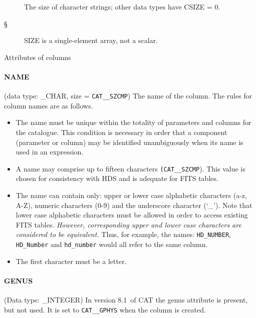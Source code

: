 \documentclass[11pt,twoside]{starlink}
\providecommand{\CATversion}{8.1~}
\begin{document}
\begin{table}[htbp]
\begin{description}

  \item[{\rm \dag}] The size of character strings; other data types
   have CSIZE = 0.

  \item[{\rm \S}] SIZE is a single-element array, not a scalar.

\end{description}

\caption{\label{CATTRIB}Attributes of columns}

\end{table}

\paragraph{NAME}
(data type: \_CHAR, size = \texttt{CAT\_\_SZCMP})
The name of the column. The rules for column names are as follows.

\begin{itemize}

  \item The name must be unique within the totality of parameters and
   columns for the catalogue. This condition is necessary in order that
   a component (parameter or column) may be identified unambiguously
   when its name is used in an expression.

  \item A name may comprise up to fifteen characters \texttt{(CAT\_\_SZCMP}). This value is chosen for consistency with HDS and
   is adequate for FITS tables.

  \item The name can contain only: upper or lower case alphabetic
   characters (a-z, A-Z), numeric characters (0-9) and the underscore
   character (`\_'). Note that lower case alphabetic characters must
   be allowed in order to access existing FITS tables. \textit{However,
   corresponding upper and lower case characters are considered to be
   equivalent.} Thus, for example, the names: \texttt{HD\_NUMBER}, \texttt{HD\_Number} and \texttt{hd\_number} would all refer to the same column.

  \item The first character must be a letter.

\end{itemize}

\paragraph{GENUS}
(Data type: \_INTEGER)
In version \CATversion of CAT the genus attribute is present, but not
used. It is set to \texttt{CAT\_\_GPHYS} when the column is created.
\end{document}
